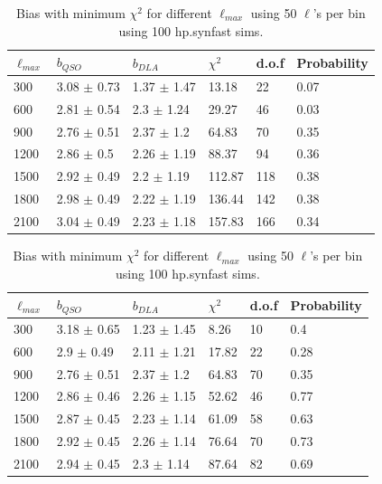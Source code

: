 \documentclass{amsart}
\begin{document}
\begin{table}[htbp]
\caption{Bias with minimum $\chi^2$  for different $\ell_{max}$ using 25 $\ell$'s per bin using 100 hp.synfast sims.}
\centering
\begin{tabular}{p{}p{}p{}p{}p{}p{}} \\ \toprule
$\ell_{max}$ & \multicolumn{1}{p{0cm}}{$b_{QSO}$} & $b_{DLA}$ & \multicolumn{1}{p{2cm}}{$\chi^2$} & d.o.f  & Probability\\ \midrule
300  &  3.08  $\pm$  0.73  &  1.37  $\pm$  1.47  &  13.18  &  22  &  0.07 \\
600  &  2.81  $\pm$  0.54  &  2.3  $\pm$  1.24  &  29.27  &  46  &  0.03 \\
900  &  2.76  $\pm$  0.51  &  2.37  $\pm$  1.2  &  64.83  &  70  &  0.35 \\
1200  &  2.86  $\pm$  0.5  &  2.26  $\pm$  1.19  &  88.37  &  94  &  0.36 \\
1500  &  2.92  $\pm$  0.49  &  2.2  $\pm$  1.19  &  112.87  &  118  &  0.38 \\
1800  &  2.98  $\pm$  0.49  &  2.22  $\pm$  1.19  &  136.44  &  142  &  0.38 \\
2100  &  3.04  $\pm$  0.49  &  2.23  $\pm$  1.18  &  157.83  &  166  &  0.34 \\ \bottomrule
\end{tabular}
\vspace{2cm}
\caption{Bias with minimum $\chi^2$  for different $\ell_{max}$ using 50 $\ell$'s per bin using 100 hp.synfast sims.}
\centering
\begin{tabular}{p{}p{}p{}p{}p{}p{}} \\ \toprule
$\ell_{max}$ & \multicolumn{1}{p{0cm}}{$b_{QSO}$} & $b_{DLA}$ & \multicolumn{1}{p{2cm}}{$\chi^2$} & d.o.f  & Probability\\ \midrule
300  &  3.18  $\pm$  0.65  &  1.23  $\pm$  1.45  &  8.26  &  10  &  0.4 \\
600  &  2.9  $\pm$  0.49  &  2.11  $\pm$  1.21  &  17.82  &  22  &  0.28 \\
900  &  2.76  $\pm$  0.51  &  2.37  $\pm$  1.2  &  64.83  &  70  &  0.35 \\
1200  &  2.86  $\pm$  0.46  &  2.26  $\pm$  1.15  &  52.62  &  46  &  0.77 \\
1500  &  2.87  $\pm$  0.45  &  2.23  $\pm$  1.14  &  61.09  &  58  &  0.63 \\
1800  &  2.92  $\pm$  0.45  &  2.26  $\pm$  1.14  &  76.64  &  70  &  0.73 \\
2100  &  2.94  $\pm$  0.45  &  2.3  $\pm$  1.14  &  87.64  &  82  &  0.69 \\ \bottomrule
\end{tabular}



\end{table}
\end{document}
